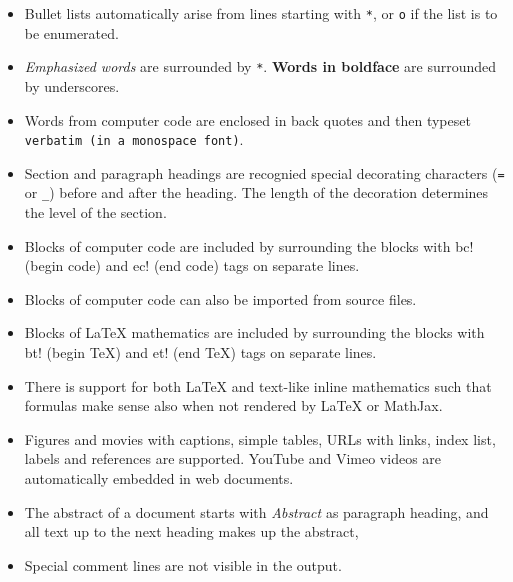 \documentclass[%
oneside,                 %
final,                   %
10pt]{article}
\begin{document}
\begin{itemize}
  \item Bullet lists automatically arise from lines starting with {\fontsize{10pt}{10pt}\Verb!*!},
    or {\fontsize{10pt}{10pt}\Verb!o!} if the list is to be enumerated.

  \item \emph{Emphasized words} are surrounded by {\fontsize{10pt}{10pt}\Verb!*!}. \textbf{Words in boldface}
    are surrounded by underscores.

  \item Words from computer code are enclosed in back quotes and
    then typeset {\fontsize{10pt}{10pt}\Verb!verbatim (in a monospace font)!}.

  \item Section and paragraph headings are recognied special
    decorating characters ({\fontsize{10pt}{10pt}\Verb!=!} or {\fontsize{10pt}{10pt}\Verb!_!}) before and after the heading.
    The length of the decoration determines the level of the
    section.

  \item Blocks of computer code are included by surrounding the blocks with
    {\fontsize{10pt}{10pt}\Verb!!bc!} (begin code) and {\fontsize{10pt}{10pt}\Verb!!ec!} (end code) tags on separate lines.

  \item Blocks of computer code can also be imported from source files.

  \item Blocks of {\LaTeX} mathematics are included by surrounding the blocks
    with {\fontsize{10pt}{10pt}\Verb!!bt!} (begin TeX) and {\fontsize{10pt}{10pt}\Verb!!et!} (end TeX) tags on separate lines.

  \item There is support for both {\LaTeX} and text-like inline mathematics
    such that formulas make sense also when not rendered by {\LaTeX}
    or MathJax.

  \item Figures and movies with captions, simple tables,
    URLs with links, index list, labels and references are supported.
    YouTube and Vimeo videos are automatically embedded in web documents.

  \item The abstract of a document starts with \emph{Abstract} as paragraph
    heading, and all text up to the next heading makes up the abstract,

  \item Special comment lines are not visible in the output.


\end{itemize}
\end{document}
